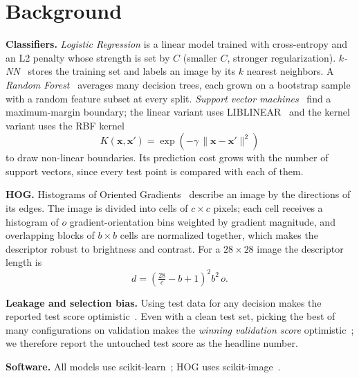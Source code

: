 \documentclass[conference]{IEEEtran}
\begin{document}
\section{Background}
\label{sec:background}
\textbf{Classifiers.} \emph{Logistic Regression} is a linear model trained with cross-entropy and an L2 penalty whose
strength is set by $C$ (smaller $C$, stronger regularization). \emph{$k$-NN}~\cite{cover1967nearest} stores the training
set and labels an image by its $k$ nearest neighbors. A \emph{Random Forest}~\cite{breiman2001random} averages many
decision trees, each grown on a bootstrap sample with a random feature subset at every split. \emph{Support vector
machines}~\cite{cortes1995support} find a maximum-margin boundary; the linear variant uses LIBLINEAR~\cite{fan2008liblinear}
and the kernel variant uses the RBF kernel
\begin{equation}
  K(\mathbf{x},\mathbf{x}') = \exp\!\left(-\gamma\,\lVert\mathbf{x}-\mathbf{x}'\rVert^2\right)
  \label{eq:rbf}
\end{equation}
to draw non-linear boundaries. Its prediction cost grows with the number of support vectors, since every test point is
compared with each of them.

\textbf{HOG.} Histograms of Oriented Gradients~\cite{dalal2005histograms} describe an image by the directions of its
edges. The image is divided into cells of $c\times c$ pixels; each cell receives a histogram of $o$ gradient-orientation
bins weighted by gradient magnitude, and overlapping blocks of $b\times b$ cells are normalized together, which makes the
descriptor robust to brightness and contrast. For a $28\times28$ image the descriptor length is
\begin{equation}
  d = \left(\tfrac{28}{c}-b+1\right)^{2} b^{2}\, o .
  \label{eq:hogdim}
\end{equation}

\textbf{Leakage and selection bias.} Using test data for any decision makes the reported test score
optimistic~\cite{kaufman2012leakage}. Even with a clean test set, picking the best of many configurations on validation
makes the \emph{winning validation score} optimistic~\cite{cawley2010overfitting}; we therefore report the untouched test
score as the headline number.

\textbf{Software.} All models use scikit-learn~\cite{pedregosa2011scikit}; HOG uses scikit-image~\cite{vanderwalt2014scikit}.

\end{document}
